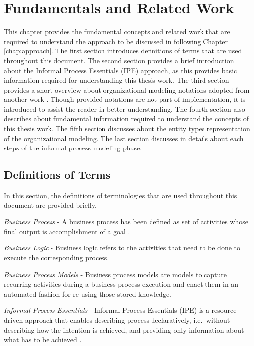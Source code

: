 \chapter{Fundamentals and Related Work}
\label{chap:fundamentals}
This chapter provides the fundamental concepts and related work that are required to understand the approach to be discussed in following Chapter \ref{chap:approach}. The first section introduces definitions of terms that are used throughout this document. The second section provides a brief introduction about the Informal Process Essentials (IPE) approach, as this provides basic information required for understanding this thesis work. The third section provides a short overview about organizational modeling notations adopted from another work \cite{Sierr2015}. Though provided notations are not part of implementation, it is introduced to assist the reader in better understanding. The fourth section also describes about fundamental information required to understand the concepts of this thesis work. The fifth section discusses about the entity types representation of the organizational modeling. The last section discusses in details about each steps of the informal process modeling phase. 

\section{Definitions of Terms}
\label{sec:termdefinitions}
In this section, the definitions of terminologies that are used throughout this document are provided briefly.

\textit{Business Process} -  A business process has been defined as set of activities whose final output is accomplishment of a goal \cite{Weske2012}.  

\textit{Business Logic} - Business logic refers to the activities that need to be done to execute the corresponding process. 

\textit{Business Process Models} - Business process models are models to capture recurring activities during a business process execution and enact them in an automated fashion for re-using those stored knowledge. 

\textit{Informal Process Essentials} - Informal Process Essentials (IPE) is a resource-driven approach that enables describing process declaratively, i.e., without describing how the intention is achieved, and providing only information about what has to be achieved \cite{Sungur2014a}. 

